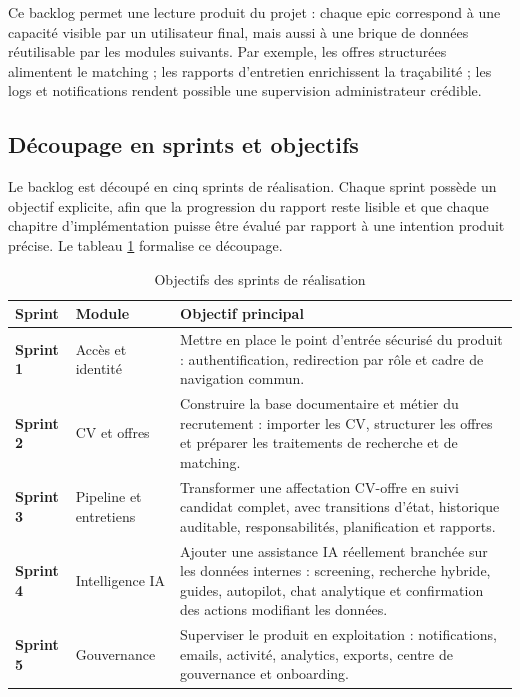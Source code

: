 Ce backlog permet une lecture produit du projet : chaque epic correspond à une capacité visible par un utilisateur final, mais aussi à une brique de données réutilisable par les modules suivants. Par exemple, les offres structurées alimentent le matching ; les rapports d'entretien enrichissent la traçabilité ; les logs et notifications rendent possible une supervision administrateur crédible.

\subsection{Découpage en sprints et objectifs}
Le backlog est découpé en cinq sprints de réalisation. Chaque sprint possède un objectif explicite, afin que la progression du rapport reste lisible et que chaque chapitre d'implémentation puisse être évalué par rapport à une intention produit précise. Le tableau \ref{tab:sprint-objectives} formalise ce découpage.

\begin{table}[H]
  \centering
  \caption{\label{tab:sprint-objectives}Objectifs des sprints de réalisation}
  \begin{tabularx}{\textwidth}{>{\bfseries}p{1.7cm}p{3.2cm}X}
    \toprule
    Sprint & Module & Objectif principal \\
    \midrule
    Sprint 1 & Accès et identité & Mettre en place le point d'entrée sécurisé du produit : authentification, redirection par rôle et cadre de navigation commun. \\
    Sprint 2 & CV et offres & Construire la base documentaire et métier du recrutement : importer les CV, structurer les offres et préparer les traitements de recherche et de matching. \\
    Sprint 3 & Pipeline et entretiens & Transformer une affectation CV-offre en suivi candidat complet, avec transitions d'état, historique auditable, responsabilités, planification et rapports. \\
    Sprint 4 & Intelligence IA & Ajouter une assistance IA réellement branchée sur les données internes : screening, recherche hybride, guides, autopilot, chat analytique et confirmation des actions modifiant les données. \\
    Sprint 5 & Gouvernance & Superviser le produit en exploitation : notifications, emails, activité, analytics, exports, centre de gouvernance et onboarding. \\
    \bottomrule
  \end{tabularx}
\end{table}


